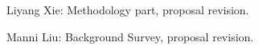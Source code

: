 
Liyang Xie: Methodology part, proposal revision. 

Manni Liu: Background Survey, proposal revision. 
